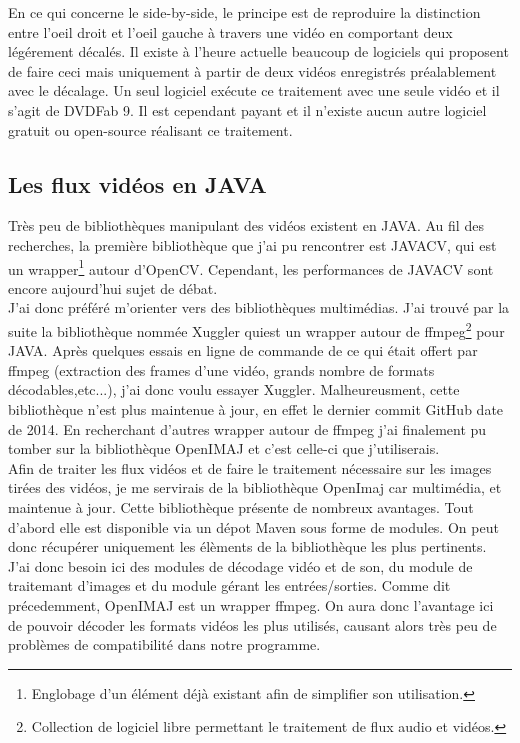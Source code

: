 \documentclass[10pt,a4paper]{article}
\begin{document}
En ce qui concerne le side-by-side, le principe est de reproduire la distinction entre l'oeil droit et l'oeil gauche à travers une vidéo en comportant deux légérement décalés.
Il existe à l'heure actuelle beaucoup de logiciels qui proposent de faire ceci mais uniquement à partir de deux vidéos enregistrés préalablement avec le décalage.
Un seul logiciel exécute ce traitement avec une seule vidéo et il s'agit de DVDFab 9. Il est cependant payant et il n'existe aucun autre logiciel gratuit ou open-source réalisant ce traitement.

\subsection{Les flux vidéos en JAVA}

Très peu de bibliothèques manipulant des vidéos existent en JAVA. Au fil des recherches, la première bibliothèque que j'ai pu rencontrer est JAVACV, qui est un wrapper\footnote{Englobage d'un élément déjà existant
afin de simplifier son utilisation.} autour d'OpenCV. Cependant, les performances de JAVACV sont encore aujourd'hui sujet de débat.\\

J'ai donc préféré m'orienter vers des bibliothèques multimédias. J'ai trouvé par la suite la bibliothèque nommée Xuggler quiest un wrapper autour de
ffmpeg\footnote{Collection de logiciel libre permettant le traitement de flux audio et vidéos.} pour JAVA. Après quelques essais en ligne de commande de ce qui était offert
par ffmpeg (extraction des frames d'une vidéo, grands nombre de formats décodables,etc...), j'ai donc voulu essayer Xuggler. Malheureusment, cette bibliothèque n'est plus maintenue à jour, en effet le dernier
commit GitHub date de 2014. En recherchant d'autres wrapper autour de ffmpeg j'ai finalement pu tomber sur la bibliothèque OpenIMAJ et c'est celle-ci que j'utiliserais.\\

Afin de traiter les flux vidéos et de faire le traitement nécessaire sur les images tirées des vidéos, je me servirais de  la bibliothèque OpenImaj car multimédia, et maintenue à jour.
Cette bibliothèque présente de nombreux avantages. Tout d'abord elle est
disponible via un dépot Maven sous forme de modules. On peut donc récupérer uniquement les élèments de la bibliothèque
les plus pertinents. J'ai donc besoin ici des modules de décodage vidéo et de son, du module de traitemant d'images
et du module gérant les entrées/sorties.
Comme dit précedemment, OpenIMAJ est un wrapper ffmpeg. On aura donc l'avantage ici de pouvoir décoder les formats vidéos
les plus utilisés, causant alors très peu de problèmes de compatibilité dans notre
programme.\\
\end{document}
